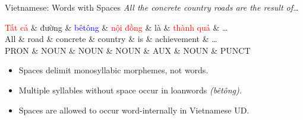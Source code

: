 \documentclass[10pt, compress, aspectratio=169]{beamer}
\newcommand{\upos}[1]{\textbf{\color{blue}#1}}
\begin{document}

\begin{frame}{Vietnamese: Words with Spaces}
\textit{All the concrete country roads are the result of\dots}

\begin{dependency}[label style={thick, font=\bfseries}]
\begin{deptext}[font=\bfseries]
\textcolor{red}{Tất cả} \& đường \& \textcolor{blue}{bêtông} \& \textcolor{red}{nội đồng} \& là \& \textcolor{red}{thành quả} \& \dots \\
All \& road \& concrete \& country \& is \& achievement \& \dots \\
PRON \& NOUN \& NOUN \& NOUN \& AUX \& NOUN \& PUNCT \\
\end{deptext}
\end{dependency}

\begin{itemize}
\item Spaces delimit monosyllabic morphemes, not words.
\item Multiple syllables without space occur in loanwords \textit{(bêtông).}
\item Spaces are allowed to occur word-internally in Vietnamese UD.
\end{itemize}
\end{frame}
\end{document}
